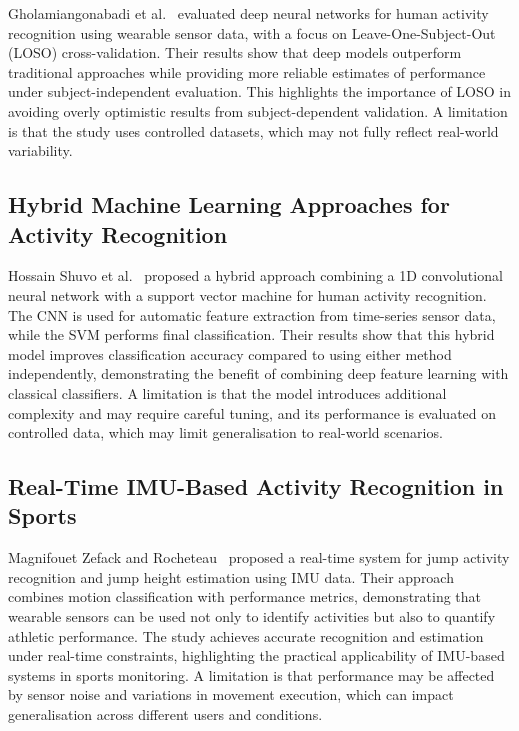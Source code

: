 \documentclass[12pt,a4paper]{cibb}
\begin{document}
Gholamiangonabadi et al.~\cite{9144538} evaluated deep neural networks 
for human activity recognition using wearable sensor data, with a focus 
on Leave-One-Subject-Out (LOSO) cross-validation. Their results show that 
deep models outperform traditional approaches while providing more 
reliable estimates of performance under subject-independent evaluation. 
This highlights the importance of LOSO in avoiding overly optimistic 
results from subject-dependent validation. A limitation is that the study 
uses controlled datasets, which may not fully reflect real-world variability.


\subsection{Hybrid Machine Learning Approaches for Activity Recognition}

Hossain Shuvo et al.~\cite{9425332} proposed a hybrid approach combining 
a 1D convolutional neural network with a support vector machine for human 
activity recognition. The CNN is used for automatic feature extraction 
from time-series sensor data, while the SVM performs final classification. 
Their results show that this hybrid model improves classification accuracy 
compared to using either method independently, demonstrating the benefit 
of combining deep feature learning with classical classifiers. A limitation is that the model introduces additional complexity and may 
require careful tuning, and its performance is evaluated on controlled 
data, which may limit generalisation to real-world scenarios.


\subsection{Real-Time IMU-Based Activity Recognition in Sports}

Magnifouet Zefack and Rocheteau~\cite{11264792} proposed a real-time 
system for jump activity recognition and jump height estimation using 
IMU data. Their approach combines motion classification with performance 
metrics, demonstrating that wearable sensors can be used not only to 
identify activities but also to quantify athletic performance. The study 
achieves accurate recognition and estimation under real-time constraints, 
highlighting the practical applicability of IMU-based systems in sports 
monitoring. A limitation is that performance may be affected by sensor noise and 
variations in movement execution, which can impact generalisation across 
different users and conditions.
\end{document}
